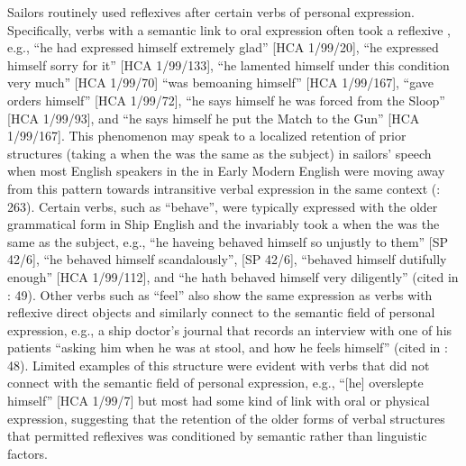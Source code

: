 Sailors routinely used reflexives after certain verbs of personal expression. Specifically, verbs with a semantic link to oral expression often took a reflexive , e.g., “he had expressed himself extremely glad” [HCA 1/99/20], “he expressed himself sorry for it” [HCA 1/99/133], “he lamented himself under this condition very much” [HCA 1/99/70] “was bemoaning himself” [HCA 1/99/167], “gave orders himself” [HCA 1/99/72], “he says himself he was forced from the Sloop” [HCA 1/99/93], and “he says himself he put the Match to the Gun” [HCA 1/99/167]. This phenomenon may speak to a localized retention of prior  structures (taking a  when the  was the same as the subject) in sailors’ speech when most English speakers in the in Early Modern English were moving away from this pattern towards intransitive verbal expression in the same context (\citealt{MillwardHayes2012}: 263). Certain verbs, such as “behave”, were typically expressed with the older  grammatical form in Ship English and the  invariably took a  when the  was the same as the subject, e.g., “he haveing behaved himself so unjustly to them” [SP 42/6], “he behaved himself scandalously”, [SP 42/6], “behaved himself dutifully enough” [HCA 1/99/112], and “he hath behaved himself very diligently” (cited in \citealt{Brown2011}: 49). Other verbs such as “feel” also show the same expression as  verbs with reflexive direct objects and similarly connect to the semantic field of personal expression, e.g., a ship doctor’s journal that records an interview with one of his patients “asking him when he was at stool, and how he feels himself” (cited in \citealt{Brown2011}: 48). Limited examples of this structure were evident with verbs that did not connect with the semantic field of personal expression, e.g., “[he] overslepte himself” [HCA 1/99/7] but most had some kind of link with oral or physical expression, suggesting that the retention of the older forms of  verbal structures that permitted reflexives was conditioned by semantic rather than linguistic factors. 

